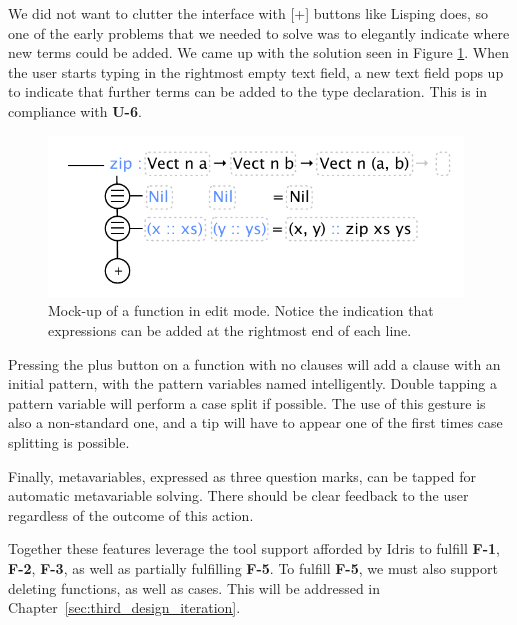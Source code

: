 
We did not want to clutter the interface with [+] buttons like Lisping does, so one of the early problems that we needed to solve was to elegantly indicate where new terms could be added.
We came up with the solution seen in Figure \ref{fig:initial_function_editing_design}.
When the user starts typing in the rightmost empty text field, a new text field pops up to indicate that further terms can be added to the type declaration. This is in compliance with \textbf{U-6}.

\begin{figure}
	\centering
		\includegraphics[width=110mm]{diagrams/initial_function_editing_design.pdf}
	\caption{Mock-up of a function in edit mode. Notice the indication that expressions can be
	added at the rightmost end of each line.}
\label{fig:initial_function_editing_design}
\end{figure}

Pressing the plus button on a function with no clauses will add a clause with an initial pattern, with the pattern variables named intelligently. 
Double tapping a pattern variable will perform a case split if possible. 
The use of this gesture is also a non-standard one, and a tip will have to appear one of the first times case splitting is possible.

Finally, metavariables, expressed as three question marks, can be tapped for automatic metavariable solving. 
There should be clear feedback to the user regardless of the outcome of this action.

Together these features leverage the tool support afforded by Idris to fulfill \textbf{F-1}, \textbf{F-2}, \textbf{F-3}, as well as partially fulfilling \textbf{F-5}. To fulfill \textbf{F-5}, we must also support deleting functions, as well as cases. This will be addressed in
Chapter~\ref{sec:third_design_iteration}.

